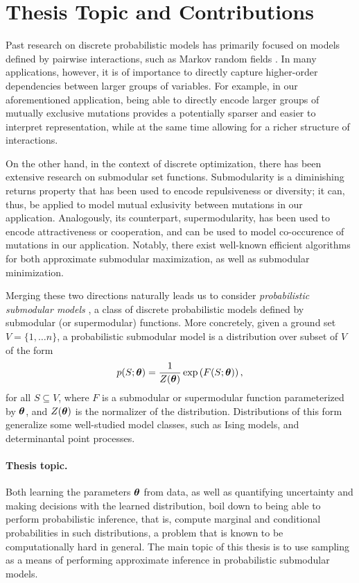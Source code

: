 \section{Thesis Topic and Contributions}
Past research on discrete probabilistic models has primarily focused on models defined by pairwise interactions, such as Markov random fields \cite{koller09}.
In many applications, however, it is of importance to directly capture higher-order dependencies between larger groups of variables.
For example, in our aforementioned application, being able to directly encode larger groups of mutually exclusive mutations provides a potentially sparser and easier to interpret representation, while at the same time allowing for a richer structure of interactions.

On the other hand, in the context of discrete optimization, there has been extensive research on submodular set functions.
Submodularity is a diminishing returns property that has been used to encode repulsiveness or diversity; it can, thus, be applied to model mutual exlusivity between mutations in our application.
Analogously, its counterpart, supermodularity, has been used to encode attractiveness or cooperation, and can be used to model co-occurence of mutations in our application.
Notably, there exist well-known efficient algorithms for both approximate submodular maximization, as well as submodular minimization.

Merging these two directions naturally leads us to consider \emph{probabilistic submodular models} \citep{djolonga14,gotovos15}, a class of discrete probabilistic models defined by submodular (or supermodular) functions.
More concretely, given a ground set $V = \{1,\ldots n\}$, a probabilistic submodular model is a distribution over subset of $V$ of the form
\begin{align*}
p(S; \bm{\theta}) = \frac{1}{Z(\bm{\theta})} \exp\left( F(S; \bm{\theta}) \right),
\end{align*}
for all $S \subseteq V$, where $F$ is a submodular or supermodular function parameterized by $\bm{\theta}$, and $Z(\bm{\theta})$ is the normalizer of the distribution.
Distributions of this form generalize some well-studied model classes, such as Ising models, and determinantal point processes.

\paragraph{Thesis topic.} Both learning the parameters $\bm{\theta}$ from data, as well as quantifying uncertainty and making decisions with the learned distribution, boil down to being able to perform probabilistic inference, that is, compute marginal and conditional probabilities in such distributions, a problem that is known to be computationally hard in general.
The main topic of this thesis is to use sampling as a means of performing approximate inference in probabilistic submodular models.

